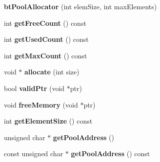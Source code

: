 \begin{DoxyCompactItemize}
\item 
\mbox{\label{classbtPoolAllocator_a00877988f8da0e869dadbed143bd7ee7}} 
{\bfseries bt\+Pool\+Allocator} (int elem\+Size, int max\+Elements)
\item 
\mbox{\label{classbtPoolAllocator_a81c9f44a991e1a1871ff9ba41308e85d}} 
int {\bfseries get\+Free\+Count} () const
\item 
\mbox{\label{classbtPoolAllocator_add80f1642da714033fd0416fa0e9d27c}} 
int {\bfseries get\+Used\+Count} () const
\item 
\mbox{\label{classbtPoolAllocator_a94af9be67306f3880ded5f1ad9420945}} 
int {\bfseries get\+Max\+Count} () const
\item 
\mbox{\label{classbtPoolAllocator_ae2d7e02c7ba5f6d713d9e8aa740095ca}} 
void $\ast$ {\bfseries allocate} (int size)
\item 
\mbox{\label{classbtPoolAllocator_a56dc7a155cfd52bffc5efe933261b6c6}} 
bool {\bfseries valid\+Ptr} (void $\ast$ptr)
\item 
\mbox{\label{classbtPoolAllocator_a26bf2c983bc378c3da96ee218861b65f}} 
void {\bfseries free\+Memory} (void $\ast$ptr)
\item 
\mbox{\label{classbtPoolAllocator_a458d373ede5ee4bded615bf7995fcc4d}} 
int {\bfseries get\+Element\+Size} () const
\item 
\mbox{\label{classbtPoolAllocator_a80d1a161e54fd676d7a4da5f98bd3686}} 
unsigned char $\ast$ {\bfseries get\+Pool\+Address} ()
\item 
\mbox{\label{classbtPoolAllocator_ab9df25899c0b922c4bb2c8ae82fc317d}} 
const unsigned char $\ast$ {\bfseries get\+Pool\+Address} () const
\item 
\mbox{\label{classbtPoolAllocator_a00877988f8da0e869dadbed143bd7ee7}} 

\end{DoxyCompactItemize}
